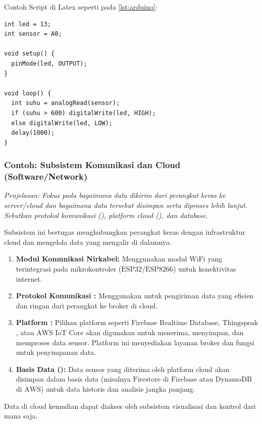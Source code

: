 \documentclass{elsinta}
\begin{document}
Contoh Script di Latex seperti pada \autoref{lst:arduino}: 
\begin{lstlisting}[caption={Contoh Kode Arduino}, label={lst:arduino}]
int led = 13;
int sensor = A0;

void setup() {
  pinMode(led, OUTPUT);
}

void loop() {
  int suhu = analogRead(sensor);
  if (suhu > 600) digitalWrite(led, HIGH);
  else digitalWrite(led, LOW);
  delay(1000);
}

\end{lstlisting}


\subsubsection{Contoh: Subsistem Komunikasi dan Cloud (Software/Network)}
\textit{Penjelasan: Fokus pada bagaimana data dikirim dari perangkat keras ke server/cloud dan bagaimana data tersebut disimpan serta diproses lebih lanjut. Sebutkan protokol komunikasi (), platform cloud (), dan database.}

Subsistem ini bertugas menghubungkan perangkat keras dengan infrastruktur cloud dan mengelola data yang mengalir di dalamnya.
\begin{enumerate}
    \item \textbf{Modul Komunikasi Nirkabel:} Menggunakan modul $\text{WiFi}$ yang terintegrasi pada mikrokontroler ($\text{ESP32/ESP8266}$) untuk konektivitas internet.
    \item \textbf{Protokol Komunikasi :} Menggunakan  untuk pengiriman data yang efisien dan ringan dari perangkat ke broker  di cloud.
    \item \textbf{Platform  :} Pilihan platform seperti $\text{Firebase Realtime Database}$, $\text{Thingspeak}$, atau $\text{AWS IoT Core}$ akan digunakan untuk menerima, menyimpan, dan memproses data sensor. Platform ini menyediakan layanan broker  dan fungsi untuk penyimpanan data.
    \item \textbf{Basis Data ():} Data sensor yang diterima oleh platform cloud akan disimpan dalam basis data (misalnya $\text{Firestore}$ di $\text{Firebase}$ atau $\text{DynamoDB}$ di $\text{AWS}$) untuk data historis dan analisis jangka panjang.
\end{enumerate}
Data di cloud kemudian dapat diakses oleh subsistem visualisasi dan kontrol dari mana saja.
\end{document}
